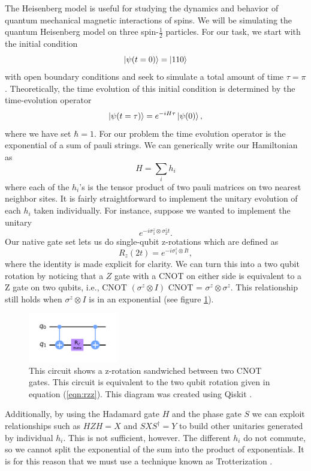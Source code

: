 \documentclass[aps,prl, reprint]{revtex4-2}
\begin{document}
The Heisenberg model is useful for studying the dynamics and behavior of quantum mechanical magnetic interactions of spins. We will be simulating the quantum Heisenberg model on three spin-$\frac{1}{2}$ particles. For our task, we start with the initial condition
\begin{equation}
\ket{\psi(t=0)} = \ket{110}
\end{equation}
with open boundary conditions and seek to simulate a total amount of time $\tau = \pi$. Theoretically, the time evolution of this initial condition is determined by the time-evolution operator
\begin{equation}
\ket{\psi(t=\tau)} = e^{-i H \tau}\ket{\psi(0)},
\end{equation}
where we have set $\hbar = 1$. For our problem the time evolution operator is the exponential of a sum of pauli strings. We can generically write our Hamiltonian as
\begin{equation}
H = \sum_i h_i
\end{equation}
where each of the $h_i$'s is the tensor product of two pauli matrices on two nearest neighbor sites. It is fairly straightforward to implement the unitary evolution of each $h_i$ taken individually. For instance, suppose we wanted to implement the unitary
\begin{equation}
e^{-i \sigma^{z}_1 \otimes \sigma^{z}_2 t}.
\label{eqn:rzz}
\end{equation}
Our native gate set lets us do single-qubit z-rotations which are defined as
\begin{equation}
R_{z}(2t)=e^{-i \sigma^{z}_1 \otimes I t },
\end{equation}
where the identity is made explicit for clarity. We can turn this into a two qubit rotation by noticing that a $Z$ gate with a CNOT on either side is equivalent to a Z gate on two qubits, i.e., CNOT $(\sigma^{z} \otimes I)$ CNOT = $\sigma^{z} \otimes \sigma^{z}$. This relationship still holds when $\sigma^{z} \otimes I$ is in an exponential (see figure \ref{fig:rzz}). 
\begin{figure}[b]
\includegraphics[width=0.35\textwidth]{Rzz.png}
\caption{This circuit shows a z-rotation sandwiched between two CNOT gates. This circuit is equivalent to the two qubit rotation given in equation (\ref{eqn:rzz}). This diagram was created using Qiskit \cite{Qiskit}.}
\label{fig:rzz}
\end{figure}
Additionally, by using the Hadamard gate $H$ and the phase gate $S$ we can exploit relationships such as $HZH = X$ and $S X S^{\dagger}=Y$ to build other unitaries generated by individual $h_i$. This is not sufficient, however. The different $h_i$ do not commute, so we cannot split the exponential of the sum into the product of exponentials. It is for this reason that we must use a technique known as Trotterization  \cite{suzuki1991general}.
\end{document}
